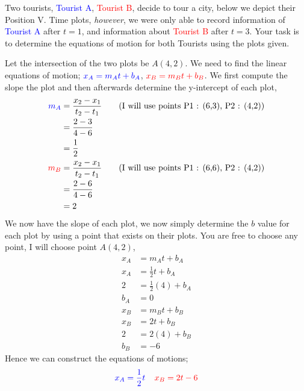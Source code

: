 \documentclass[12pt]{article} %
\begin{document}
\begin{qstn}[8]
	Two tourists, \textcolor{blue}{Tourist A}, \textcolor{red}{Tourist B}, decide to tour a city, below we depict their Position V. Time plots, \emph{however}, we were only able to record information of \textcolor{blue}{Tourist A} after $t = 1$, and information about \textcolor{red}{Tourist B} after $t = 3$. Your task is to determine the equations of motion for both Tourists using the plots given.
	\begin{center}
		\end{center}

		\begin{soln}
			Let the intersection of the two plots be $A(4,2)$. We need to find the linear equations of motion; $\textcolor{blue}{x_A = m_At + b_A}$, $\textcolor{red}{x_B = m_Bt + b_B}$. We first compute the slope the plot and then afterwards determine the y-intercept of each plot,
			\begin{align*}
				\textcolor{blue}{m_A} &= \frac{x_2 - x_1}{t_2 - t_1} \tag{I will use points P1 : (6,3), P2 : (4,2)}\\
				&= \frac{2 - 3}{4 - 6}\\
				&= \frac{1}{2}\\
				\textcolor{red}{m_B} &= \frac{x_2 - x_1}{t_2 - t_1} \tag{I will use points P1 : (6,6), P2 : (4,2)}\\
				&= \frac{2 - 6}{4 - 6}\\
				&= 2
			\end{align*}
			We now have the slope of each plot, we now simply determine the $b$ value for each plot by using a point that exists on their plots. You are free to choose any point, I will choose point $A(4,2)$,
			\begin{align*}
				x_A &= m_At + b_A\\
				x_A &= \frac{1}{2}t + b_A\\
				2 &= \frac{1}{2}\left(4\right) + b_A \tag{Inserting point (4,2)}\\
				b_A &= 0\\
				x_B &= m_Bt + b_B\\
				x_B &= 2t + b_B\\
				2 &= 2(4) + b_B \tag{Inserting point (4,2)}\\
				b_B &= -6
			\end{align*}
			Hence we can construct the equations of motions; 
			$$\textcolor{blue}{x_A = \frac{1}{2}t} \:\:\:\:\: \textcolor{red}{x_B = 2t - 6}$$
		\end{soln}


\end{qstn}
\end{document}
